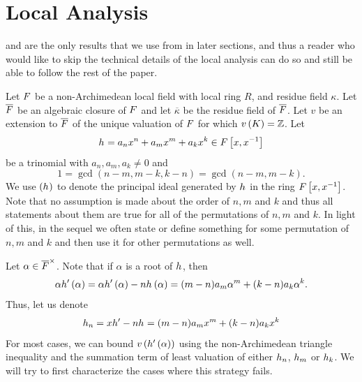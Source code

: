 \documentclass[../main.tex]{subfiles}
\begin{document}
  \section{
    \label{sec:local}
    Local Analysis
  }
   and  are the only results that we use from  in later sections, and thus a reader who would like to skip the technical details of the local analysis can do so and still be able to follow the rest of the paper.

  Let $F$ be a non-Archimedean local field with local ring $R$, and residue field $\kappa$. 
  Let $\overline{F}$ be an algebraic closure of $F$ and let $\overline{\kappa}$ be the residue field of $\overline{F}$.
  Let $v$ be an extension to $\overline{F}$ of the unique valuation of $F$ for which $v\left( K \right) = \mathbb{Z}$.
  Let 
  \[
    h_{} = a_n x^n + a_m x^m + a_k x^k \in F\left[ x, x^{-1} \right]
  \]
  be a trinomial with $a_n, a_m, a_k \neq 0$ and 
  \[
    1 = \gcd\left( n - m, m - k, k - n \right) = \gcd\left( n - m, m - k \right).
  \]
  We use $\left( h_{} \right)$ to denote the principal ideal generated by $h_{}$ in the ring $F\left[ x, x^{-1} \right]$.
  Note that no assumption is made about the order of $n,m$ and $k$ and thus all statements about them are true for all of the permutations of $n,m$ and $k$.
  In light of this, in the sequel we often state or define something for some permutation of $n,m$ and $k$ and then use it for other permutations as well. 
  
  Let $\alpha \in \overline{F}^\times$.
  Note that if $\alpha$ is a root of $h_{}$, then
  \[
    \alpha h_{}'\left( \alpha \right) 
    = 
    \alpha h_{}'\left( \alpha \right) - nh_{}\left( \alpha \right)
    =
    (m - n) a_m \alpha^m + (k - n) a_k \alpha^k.
  \] 
  Thus, let us denote
  \[
    h_{n} 
    =
    xh_{}' - nh_{} 
    = 
    (m - n) a_m x^m + (k - n) a_k x^k
  \]
  For most cases, we can bound $v\left( h_{}'\left( \alpha \right) \right)$ using the non-Archimedean triangle inequality and the summation term of least valuation of either $h_{n}$, $h_{m}$ or $h_{k}$.
  We will try to first characterize the cases where this strategy fails.
  
\end{document}
